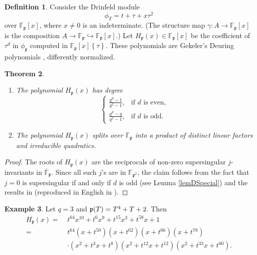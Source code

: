 \documentclass[12pt]{amsart}
\newtheorem{thm}{Theorem}[section]
\theoremstyle{definition}
\newtheorem{defn}[thm]{Definition}
\newtheorem{example}[thm]{Example}
\theoremstyle{remark}
\numberwithin{equation}{section}
\numberwithin{thm}{section}
\newcommand{\fp}{\mathfrak{p}}
\newcommand{\F}{\mathbb{F}}
\newcommand{\oF}{\overline{\F}}
\newcommand{\twist}[1]{#1\!\left\{\tau\right\}}
\begin{document}
	\begin{defn}\label{defHp}
		Consider the Drinfeld module
		\begin{equation}\label{eqLegendre}
			\phi_T=t+\tau+x \tau^2
		\end{equation}
		over $\F_\fp[x]$, where $x\neq 0$ is an indeterminate. (The structure map $\gamma\colon A\to \F_\fp[x]$ is the composition $A\to \F_\fp\hookrightarrow \F_\fp[x]$.) Let $H_\fp(x)\in \F_\fp[x]$ be the coefficient of $\tau^d$ in $\phi_\fp$ computed in $\twist{\F_\fp[x]}$.
		These polynomials are Gekeler's Deuring polynomials \cite{Gekeler83}, differently normalized.
	\end{defn}
	
	\begin{thm}\hfill
		\begin{enumerate}
			\item	The polynomial $H_\fp(x)$ has degree
			\[
			\begin{cases}
				\frac{q^d-1}{q^2-1}, & \text{if $d$ is even}, \\
				\frac{q^d-q}{q^2-1} , & \text{if $d$ is odd}.
			\end{cases}
			\]
			\item The polynomial $H_\fp(x)$ splits over $\F_\fp$ into a product of distinct linear factors and irreducible
			quadratics.
		\end{enumerate}
	\end{thm}
	\begin{proof}
		The roots of $H_\fp(x)$ are the reciprocals of non-zero supersingular $j$-invariants in $\oF_\fp$.
		Since all such $j$'s are in $\F_{\fp^2}$, the claim follows from the fact that $j=0$ is supersingular
		if and only if $d$ is odd (see Lemma \ref{lemDSpecial}) and the results in \cite{Gekeler83} (reproduced in English in \cite[pp. 266-267]{PapikianGTM}).
	\end{proof}
	
	\begin{example}\label{Example1}
		Let $q=3$ and $\frak p(T)=T^4+T+2$. Then
		\[
		\begin{aligned}
			H_\fp(x)=\;&t^{64}x^{10}+t^{6}x^{9}+t^{15}x^{3}+t^{58}x+1\\
			=\;&t^{64}(x+t^{50})(x+t^{62})(x+t^{66})(x+t^{78})\\
			&\cdot (x^2+t^{3}x+t^{8})(x^2+t^{12}x+t^{12})(x^2+t^{33}x+t^{60}).
		\end{aligned}
		\]
	\end{example}
	
\end{document}
